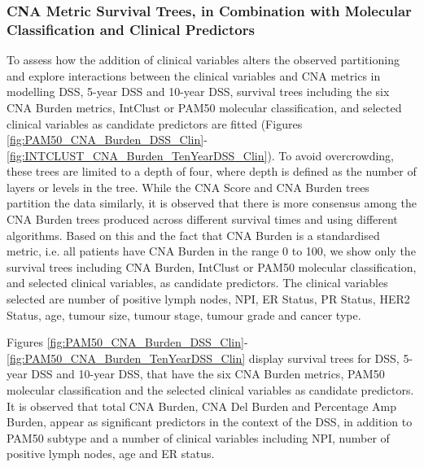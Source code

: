 \subsubsection{CNA Metric Survival Trees, in Combination with Molecular Classification and Clinical Predictors}
To assess how the addition of clinical variables alters the observed partitioning and explore interactions between the clinical variables and CNA metrics in modelling DSS, 5-year DSS and 10-year DSS, survival trees including the six CNA Burden metrics, IntClust or PAM50 molecular classification, and selected clinical variables as candidate predictors are fitted (Figures \ref{fig:PAM50_CNA_Burden_DSS_Clin}-\ref{fig:INTCLUST_CNA_Burden_TenYearDSS_Clin}). To avoid overcrowding, these trees are limited to a depth of four, where depth is defined as the number of layers or levels in the tree. While the CNA Score and CNA Burden trees partition the data similarly, it is observed that there is more consensus among the CNA Burden trees produced across different survival times and using different algorithms. Based on this and the fact that CNA Burden is a standardised metric, i.e. all patients have CNA Burden in the range 0 to 100, we show only the survival trees including CNA Burden, IntClust or PAM50 molecular classification, and selected clinical variables, as candidate predictors. The clinical variables selected are number of positive lymph nodes, NPI, ER Status, PR Status, HER2 Status, age, tumour size, tumour stage, tumour grade and cancer type.  

Figures \ref{fig:PAM50_CNA_Burden_DSS_Clin}-\ref{fig:PAM50_CNA_Burden_TenYearDSS_Clin} display survival trees for DSS, 5-year DSS and 10-year DSS, that have the six CNA Burden metrics, PAM50 molecular classification and the selected clinical variables as candidate predictors. It is observed that total CNA Burden, CNA Del Burden and Percentage Amp Burden, appear as significant predictors in the context of the DSS, in addition to PAM50 subtype and a number of clinical variables including NPI, number of positive lymph nodes, age and ER status.

